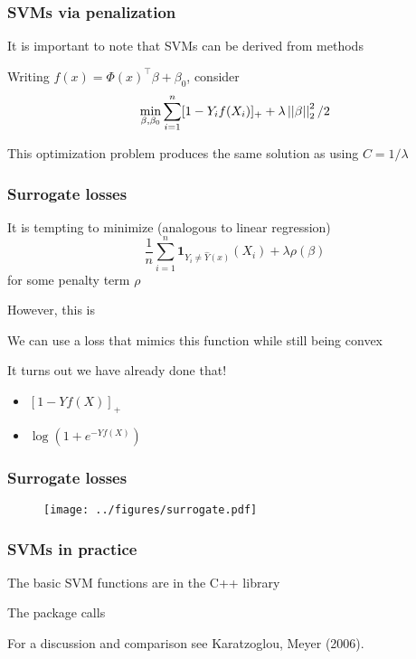 \documentclass[12pt]{beamer}
\begin{document}
\begin{frame}
\frametitle{SVMs via penalization}
It is important to note that SVMs can be derived from  methods

\vsp
Writing $f(x) = \Phi(x)^{\top} \beta + \beta_0$, consider
\[
\min_{\beta,\beta_0} \sum_{i=1}^n [ 1 - Y_i f(X_i)]_+ + \lambda\left|\left| \beta \right|\right|_2^2 /2
\]

This optimization problem produces the same solution as using $C = 1/\lambda$

\end{frame}


\begin{frame}
\frametitle{Surrogate losses}
It is tempting to minimize (analogous to linear regression)
\[
\frac{1}{n}\sum_{i=1}^n \mathbf{1}_{Y_i \neq \hat{Y}(x)}(X_i) + \lambda \rho(\beta)
\]
for some penalty term $\rho$

\vsp
However, this is 

\vsp
{} We can use a  loss that mimics this function while still being
convex

\vsp
It turns out we have already done that!
\begin{itemize}
\item  {} $[ 1 - Y f(X)]_+$
\item  {} $\log(1 + e^{-Y f(X)})$
\end{itemize}
\end{frame}

\begin{frame}
\frametitle{Surrogate losses}
\begin{figure}
\centering
\texttt{[image: ../figures/surrogate.pdf]}
\end{figure}
\end{frame}

\begin{frame}
\frametitle{SVMs in practice}
 The basic SVM functions are in the C++ library  
\vsp

 The  package  calls  
\vsp

 


\vsp

For a discussion and comparison see Karatzoglou, Meyer (2006).
\end{frame}
\end{document}
